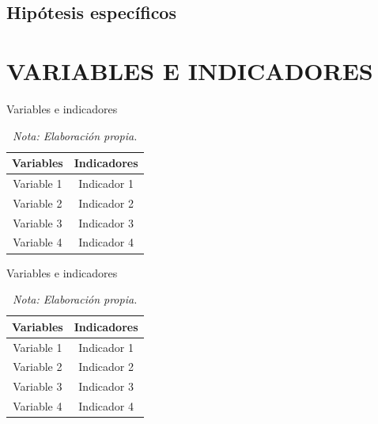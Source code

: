 \documentclass[12pt,a4paper]{article} %
\begin{document}
    \subsection{Hipótesis específicos}
    	\lipsum[16]

			\lipsum[17]

			\lipsum[18]


\newpage
\section{VARIABLES E INDICADORES}
    \lipsum[17]
		\begin{table}[h]
        \raggedright
        \caption{Variables e indicadores}
          \begin{tabular}{|c|c|}
             \hline
             Variables & Indicadores \\
             \hline
             Variable 1 & Indicador 1\\
             Variable 2 & Indicador 2\\
             Variable 3 & Indicador 3\\
             Variable 4 & Indicador 4\\
            \hline
           \end{tabular}
         \vspace{2mm}
        \caption*{\it Nota: Elaboración propia.}
        \label{tab: Variables e indicadores}
    \end{table}
		\lipsum[1]

		\begin{table}[h]
        \raggedright
        \caption{Variables e indicadores}
          \begin{tabular}{|c|c|}
             \hline
             Variables & Indicadores \\
             \hline
             Variable 1 & Indicador 1\\
             Variable 2 & Indicador 2\\
             Variable 3 & Indicador 3\\
             Variable 4 & Indicador 4\\
            \hline
           \end{tabular}
         \vspace{2mm}
        \caption*{\it Nota: Elaboración propia.}
        \label{tab: Variables e indicadores}
    \end{table}
\end{document}
